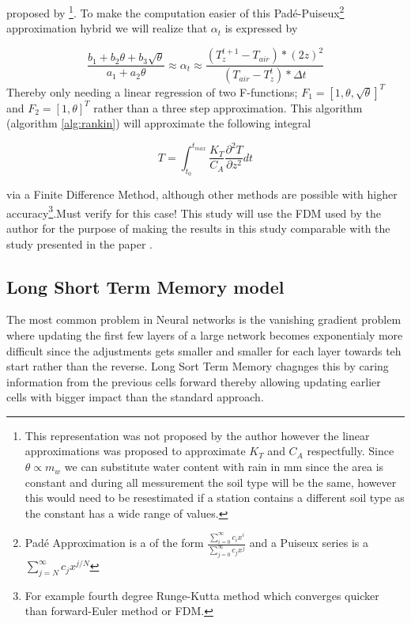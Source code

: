 proposed by \citeauthor{kodesova_thermal_2013}\cite{kodesova_thermal_2013}\footnote{This representation was not proposed by the author however the linear approximations was proposed to approximate $K_T$ and $C_A$ respectfully. Since $\theta \propto m_w$ we can substitute water content with rain in mm since the area is constant and during all messurement the soil type will be the same, however this would need to be resestimated if a station contains a different soil type as the constant has a wide range of values\cite{kodesova_thermal_2013}.}. To make the computation easier of this Padé-Puiseux\footnote{Padé Approximation is a of the form $\frac{\sum_{i=0}^\infty c_ix^i}{\sum_{j=0}^\infty c_jx^j}$ and a Puiseux series is a $\sum_{j=N}^\infty c_jx^{j/N}$} approximation hybrid we will realize that $\alpha_t$ is expressed by

$$
	\frac{b_1 + b_2\theta +b_3\sqrt{\theta}}{a_1 + a_2\theta} \approx \alpha_t \approx \frac{(T_z^{t+1} - T_{air})*(2z)^2}{( T_{air} - T_z^{t})*\Delta t} 
$$
Thereby only needing a linear regression of two F-functions; $F_1 = [ 1,\theta ,\sqrt{\theta} ]^T$ and $F_2 = [1 , \theta]^T$ rather than a three step approximation. This algorithm (algorithm \ref{alg:rankin}) will approximate the following integral

$$
T = \int_{t_0}^{t_{max}} \frac{K_T}{C_A}\frac{\partial^2 T}{\partial z^2} dt
$$

via a Finite Difference Method, although other methods are possible with higher accuracy\footnote{For example fourth degree Runge-Kutta method\cite{runge_ueber_1895} which converges quicker than forward-Euler method or FDM.}.\alert{Must verify for this case!} This study will use the FDM used by the author for the purpose of making the results in this study comparable with the study presented in the paper . 

\subsection{Long Short Term Memory model}

The most common problem in Neural networks is the vanishing gradient problem where updating the first few layers of a large network becomes exponentialy more difficult since the adjustments gets smaller and smaller for each layer towards teh start rather than the reverse. Long Sort Term Memory chagnges this by caring information from the previous cells forward thereby allowing updating earlier cells with bigger impact than the standard approach\cite{hochreiter_long_1997}.

